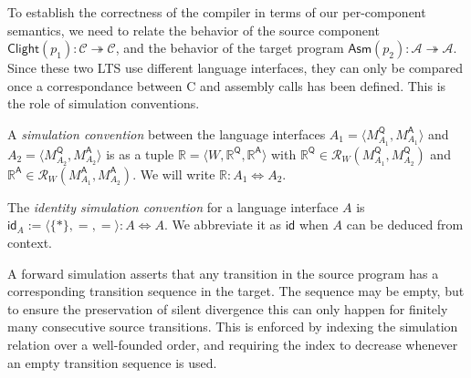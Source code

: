 \documentclass[sigplan,10pt,review,anonymous]{acmart}
\newcommand{\kw}[1]{\ensuremath{ \mathsf{#1} }}
\begin{document}
To establish the correctness of the compiler
in terms of our per-component semantics,
we need to relate the behavior of the source component
$\kw{Clight}(p_1) : \mathcal{C} \twoheadrightarrow \mathcal{C}$,
and the behavior of the target program
$\kw{Asm}(p_2) : \mathcal{A} \twoheadrightarrow \mathcal{A}$.
Since these two LTS
use different language interfaces,
they can only be compared once a correspondance between
C and assembly calls has been defined.
This is the role of simulation conventions.

\begin{definition} %
A \emph{simulation convention} between the language interfaces
$A_1 = \langle M_{A_1}^\kw{Q}, M_{A_1}^\kw{A} \rangle$ and
$A_2 = \langle M_{A_2}^\kw{Q}, M_{A_2}^\kw{A} \rangle$
is as a tuple $\mathbb{R} = \langle W, \mathbb{R}^\kw{Q}, \mathbb{R}^\kw{A} \rangle$
with $\mathbb{R}^\kw{Q} \in \mathcal{R}_W(M_{A_1}^\kw{Q}, M_{A_2}^\kw{Q})$
and $\mathbb{R}^\kw{A} \in \mathcal{R}_W(M_{A_1}^\kw{A}, M_{A_2}^\kw{A})$.
We will write $\mathbb{R} : A_1 \Leftrightarrow A_2$.
\end{definition}

\begin{definition} %
The \emph{identity simulation convention} for
a language interface $A$ is
$\kw{id}_A := \langle \{*\}, {=}, {=} \rangle : A \Leftrightarrow A$.
We abbreviate it as $\kw{id}$ when $A$ can be deduced
from context.
\end{definition}


A forward simulation asserts that any transition in the source program
has a corresponding transition sequence in the target.
The sequence may be empty,
but to ensure the preservation of silent divergence
this can only happen for finitely many consecutive source transitions.
This is enforced by indexing the simulation relation
over a well-founded order,
and requiring the index to decrease
whenever an empty transition sequence is used.
\end{document}

